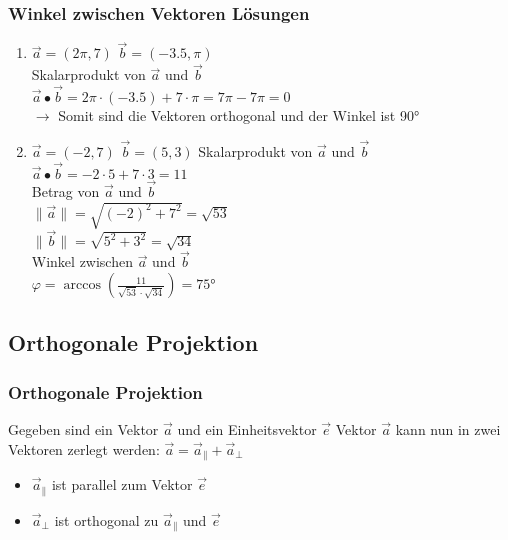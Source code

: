 \begin{frame}
    \frametitle{Winkel zwischen Vektoren Lösungen}
    \begin{enumerate}
        \item $\vec{a} = (2\pi, 7)$ $\vec{b} = (-3.5, \pi)$ \\
        Skalarprodukt von $\vec{a}$ und $\vec{b}$ \\
        $\vec{a} \bullet \vec{b} = 2\pi \cdot (-3.5) + 7 \cdot \pi = 7\pi - 7\pi = 0$ \\
        $\rightarrow$ Somit sind die Vektoren orthogonal und der Winkel ist 90° \\
        $ $ \\
        \item $\vec{a} = (-2, 7)$ $\vec{b} = (5, 3)$
        Skalarprodukt von $\vec{a}$ und $\vec{b}$ \\
        $\vec{a} \bullet \vec{b} = -2 \cdot 5 + 7 \cdot 3 = 11$ \\
        Betrag von $\vec{a}$ und $\vec{b}$ \\
        $\lVert \vec{a} \rVert = \sqrt{(-2)^2 + 7^2} = \sqrt{53}$ \\
        $\lVert \vec{b} \rVert = \sqrt{5^2 + 3^2} = \sqrt{34}$ \\
        Winkel zwischen $\vec{a}$ und $\vec{b}$ \\
        $\varphi = \arccos(\frac{11}{\sqrt{53} \cdot \sqrt{34}}) = 75$°
    \end{enumerate}
\end{frame}

\subsection{Orthogonale Projektion}
\begin{frame}
    \frametitle{Orthogonale Projektion}
    \vfill Gegeben sind ein Vektor $\vec{a}$ und ein Einheitsvektor $\vec{e}$
    \vfill Vektor $\vec{a}$ kann nun in zwei Vektoren zerlegt werden:
    \vfill $\vec{a} = \vec{a}_{\parallel} + \vec{a}_{\perp}$
    \vfill \begin{itemize}
        \item $\vec{a}_{\parallel}$ ist parallel zum Vektor $\vec{e}$
        \item $\vec{a}_{\perp}$ ist orthogonal zu $\vec{a}_{\parallel}$ und $\vec{e}$
    \end{itemize}
\end{frame}

